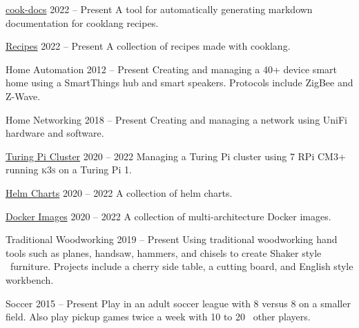 
\WorkEntry
  {\href{https://github.com/nicholaswilde/cook-docs}{cook-docs}}
  {2022 -- Present}
  {}
  {A tool for automatically generating markdown documentation for cooklang recipes.}
\sepspace

\WorkEntry
  {\href{https://github.com/nicholaswilde/recipes}{Recipes}}
  {2022 -- Present}
  {}
  {A collection of recipes made with cooklang.}
\sepspace

\WorkEntry
  {Home Automation}
  {2012 -- Present}
  {}
  {Creating and managing a 40+ device smart home using a SmartThings hub and smart speakers. Protocols include ZigBee and Z-Wave.}
\sepspace

\WorkEntry
  {Home Networking}
  {2018 -- Present}
  {}
  {Creating and managing a network using UniFi hardware and software.}
\sepspace

\WorkEntry
  {\href{https://github.com/nicholaswilde/home-cluster}{Turing Pi Cluster}}
  {2020 -- 2022}
  {}
  {Managing a Turing Pi cluster using 7 RPi CM3+ running \textsc{k3s} on a Turing Pi 1.}
\sepspace

\WorkEntry
  {\href{https://github.com/nicholaswilde/helm-charts}{Helm Charts}}
  {2020 -- 2022}
  {}
  {A collection of helm charts.}
\sepspace

\WorkEntry
  {\href{https://github.com/search?q=user\%3Anicholaswilde+docker&type=Repositories}{Docker Images}}
  {2020 -- 2022}
  {}
  {A collection of multi-architecture Docker images.}
\sepspace

\WorkEntry
  {Traditional Woodworking}
  {2019 -- Present}
  {}
  {Using traditional woodworking hand tools such as planes, handsaw, hammers, and chisels to create Shaker style%
  \ furniture. Projects include a cherry side table, a cutting board, and English style workbench.}
\sepspace

\WorkEntry
  {Soccer}
  {2015 -- Present}
  {}
  {Play in an adult soccer league with 8 versus 8 on a smaller field. Also play pickup games twice a week with 10 to 20%
  \ other players.}
